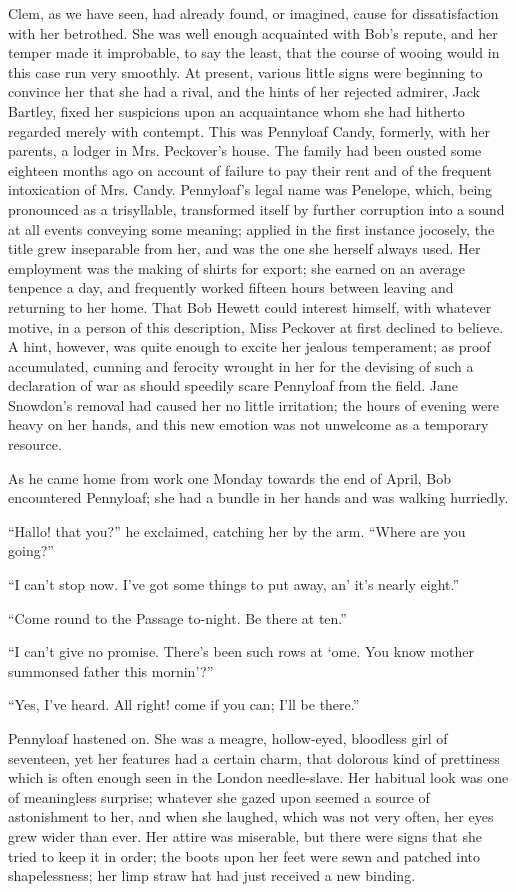 Clem, as we have seen, had already found, or imagined, cause for
dissatisfaction with her betrothed. She was well enough acquainted with
Bob's repute, and her temper made it improbable, to say the least, that
the course of wooing would in this case run very smoothly. At present,
various little signs were beginning to convince her that she had a
rival, and the {}hints of her rejected admirer, Jack Bartley, fixed her
suspicions upon an acquaintance whom she had hitherto regarded merely
with contempt. This was Pennyloaf Candy, formerly, with her parents, a
lodger in Mrs. Peckover's house. The family had been ousted some
eighteen months ago on account of failure to pay their rent and of the
frequent intoxication of Mrs. Candy. Pennyloaf's legal name was
Penelope, which, being pronounced as a trisyllable, transformed itself
by further corruption into a sound at all events conveying some meaning;
applied in the first instance jocosely, the title grew inseparable from
her, and was the one she herself always used. Her employment was the
making of shirts for export; she earned on an average tenpence a day,
and frequently worked fifteen hours between leaving and returning to her
home. That Bob Hewett could interest himself, with whatever motive, in a
person of this description, Miss Peckover at first declined to believe.
A hint, however, was quite enough to excite her jealous temperament; as
proof {}accumulated, cunning and ferocity wrought in her for the
devising of such a declaration of war as should speedily scare Pennyloaf
from the field. Jane Snowdon's removal had caused her no little
irritation; the hours of evening were heavy on her hands, and this new
emotion was not unwelcome as a temporary resource.

As he came home from work one Monday towards the end of April, Bob
encountered Pennyloaf; she had a bundle in her hands and was walking
hurriedly.

``Hallo! that you?'' he exclaimed, catching her by the arm. ``Where are
you going?''

``I can't stop now. I've got some things to put away, an' it's nearly
eight.''

``Come round to the Passage to-night. Be there at ten.''

``I can't give no promise. There's been such rows at `ome. You know
mother summonsed father this mornin'?''

``Yes, I've heard. All right! come if you can; I'll be there.''

Pennyloaf hastened on. She was a meagre, {}hollow-eyed, bloodless girl
of seventeen, yet her features had a certain charm, that dolorous kind
of prettiness which is often enough seen in the London needle-slave. Her
habitual look was one of meaningless surprise; whatever she gazed upon
seemed a source of astonishment to her, and when she laughed, which was
not very often, her eyes grew wider than ever. Her attire was miserable,
but there were signs that she tried to keep it in order; the boots upon
her feet were sewn and patched into shapelessness; her limp straw hat
had just received a new binding.

